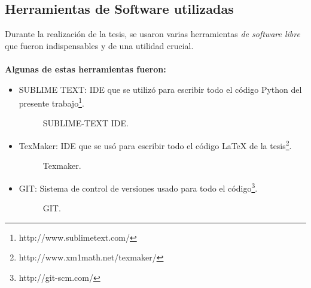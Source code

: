 	\subsection{Herramientas de Software utilizadas}
	    Durante la realización de la tesis, se usaron varias herramientas \textit{de software libre} que fueron indispensables y de una utilidad crucial. \\
	    \\
	   \textbf{ Algunas de estas herramientas fueron:}
	   \begin{itemize}

	       \item SUBLIME TEXT: IDE que se utilizó para escribir todo el código Python del presente trabajo\footnote{http://www.sublimetext.com/}.
					\begin{figure}[htbp]
						\centering
						\caption{SUBLIME-TEXT IDE.}
						\label{fig:sublime_ide}
					\end{figure}

	       \item TexMaker: IDE que se usó para escribir todo el código \LaTeX{} de la tesis\footnote{http://www.xm1math.net/texmaker/}.
					\begin{figure}[htbp]
						\centering
						\caption{Texmaker.}
						\label{fig:texmaker}
					\end{figure}

	       \item GIT: Sistema de control de versiones usado para todo el código\footnote{http://git-scm.com/}.
					\begin{figure}[htbp]
						\centering
						\caption{GIT.}
						\label{fig:git}
					\end{figure}
	   \end{itemize}
	
